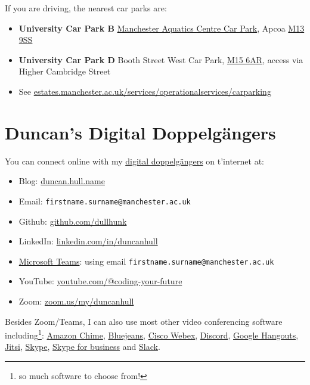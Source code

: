 \documentclass[
  12pt,
]{book}
\providecommand{\tightlist}{%
  \setlength{\itemsep}{0pt}\setlength{\parskip}{0pt}}
\begin{document}
If you are driving, the nearest car parks are:

\begin{itemize}
\tightlist
\item
  \textbf{University Car Park B} \href{https://www.apcoa.co.uk/parking-in/manchester/aquatics-centre/}{Manchester Aquatics Centre Car Park}, Apcoa \href{http://maps.google.co.uk/maps?q=M13+9SS}{M13 9SS}
\item
  \textbf{University Car Park D} Booth Street West Car Park, \href{http://maps.google.co.uk/maps?q=M15+6AR}{M15 6AR}, access via Higher Cambridge Street
\item
  See \href{https://www.estates.manchester.ac.uk/services/operationalservices/carparking/}{estates.manchester.ac.uk/services/operationalservices/carparking}
\end{itemize}

\hypertarget{tinternet}{%
\section{Duncan's Digital Doppelgängers}\label{tinternet}}

You can connect online with my \href{https://en.wikipedia.org/wiki/Doppelganger:_A_Trip_Into_the_Mirror_World}{digital doppelgängers} on t'internet at:

\begin{itemize}
\tightlist
\item
  Blog: \href{https://duncan.hull.name}{duncan.hull.name}
\item
  Email: \texttt{firstname.surname@manchester.ac.uk}
\item
  Github: \href{https://github.com/dullhunk}{github.com/dullhunk}
\item
  LinkedIn: \href{https://uk.linkedin.com/in/duncanhull}{linkedin.com/in/duncanhull}
\item
  \href{https://en.wikipedia.org/wiki/Microsoft_Teams}{Microsoft Teams}: using email \texttt{firstname.surname@manchester.ac.uk}
\item
  YouTube: \href{https://www.youtube.com/@coding-your-future}{youtube.com/@coding-your-future}
\item
  Zoom: \href{https://zoom.us/my/duncanhull}{zoom.us/my/duncanhull}
\end{itemize}

Besides Zoom/Teams, I can also use most other video conferencing software including\footnote{so much software to choose from!}: \href{https://aws.amazon.com/chime/}{Amazon Chime}, \href{https://en.wikipedia.org/wiki/BlueJeans}{Bluejeans}, \href{https://en.wikipedia.org/wiki/Cisco_Webex}{Cisco Webex}, \href{https://en.wikipedia.org/wiki/Discord_(software)}{Discord}, \href{https://en.wikipedia.org/wiki/Google_Hangouts}{Google Hangouts}, \href{https://en.wikipedia.org/wiki/Jitsi}{Jitsi}, \href{https://en.wikipedia.org/wiki/Skype}{Skype}, \href{https://en.wikipedia.org/wiki/Skype_for_Business}{Skype for business} and \href{https://en.wikipedia.org/wiki/Slack_(software)}{Slack}.
\end{document}
